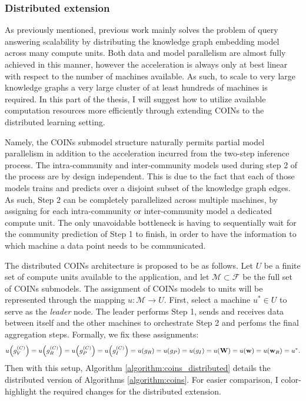 \subsubsection{Distributed extension}

As previously mentioned, previous work mainly solves the problem of query answering scalability by distributing the knowledge graph embedding model across many compute units. Both data and model parallelism are almost fully achieved in this manner, however the acceleration is always only at best linear with respect to the number of machines available. As such, to scale to very large knowledge graphs a very large cluster of at least hundreds of machines is required. In this part of the thesis, I will suggest how to utilize available computation resources more efficiently through extending COINs to the distributed learning setting.

Namely, the COINs submodel structure naturally permits partial model parallelism in addition to the acceleration incurred from the two-step inference process. The intra-community and inter-community models used during step 2 of the process are by design independent. This is due to the fact that each of those models trains and predicts over a disjoint subset of the knowledge graph edges. As such, Step 2 can be completely parallelized across multiple machines, by assigning for each intra-community or inter-community model a dedicated compute unit. The only unavoidable bottleneck is having to sequentially wait for the community prediction of Step 1 to finish, in order to have the information to which machine a data point needs to be communicated.

The distributed COINs architecture is proposed to be as follows. Let $U$ be a finite set of compute units available to the application, and let $\mathcal{M} \subset \mathcal{F}$ be the full set of COINs submodels. The assignment of COINs models to units will be represented through the mapping $u: \mathcal{M} \to U$. First, select a machine $u^* \in U$ to serve as the \emph{leader} node. The leader performs Step 1, sends and receives data between itself and the other machines to orchestrate Step 2 and perfoms the final aggregation steps. Formally, we fix these assignments:
$$u\mathopen{}\left(g_V^{\mathopen{}\left(C\right)}\right)=u\mathopen{}\left(g_R^{\mathopen{}\left(C\right)}\right)=u\mathopen{}\left(g_P^{\mathopen{}\left(C\right)}\right)=u\mathopen{}\left(g_I^{\mathopen{}\left(C\right)}\right)=u\mathopen{}\left(g_R\right)=u\mathopen{}\left(g_P\right)=u\mathopen{}\left(g_I\right)=u\mathopen{}\left(\mathbf{W}\right)=u\mathopen{}\left(\mathbf{w}\right)=u\mathopen{}\left(\mathbf{w}_R\right)=u^*.$$
Then with this setup, Algorithm \ref{algorithm:coins_distributed} details the distributed version of Algorithms \ref{algorithm:coins}. For easier comparison, I color-highlight the required changes for the distributed extension.

